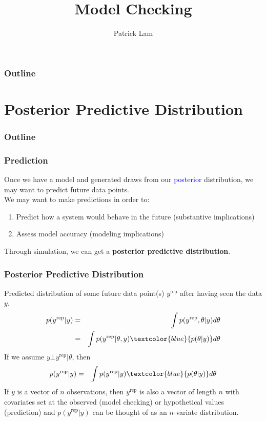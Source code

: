 \documentclass{beamer}
\author{Patrick Lam}
\title{Model Checking}
\date{}
\begin{document}
\newcommand{\red}{\textcolor{red}}
\newcommand{\blue}{\textcolor{blue}}
\newcommand{\cyan}{\textcolor{cyan}}
\newcommand{\purple}{\textcolor{purple}}
\newcommand{\brown}{\textcolor{brown}}

\frame{\titlepage}

\begin{frame}
\frametitle{Outline}
\tableofcontents
\end{frame}

\section{Posterior Predictive Distribution}

\begin{frame}
\frametitle{Outline}
\tableofcontents[currentsection]
\end{frame}

\begin{frame}
\frametitle{Prediction}
\pause
Once we have a model and generated draws from our \blue{posterior}
distribution, we may want to predict future data points.  \\
\pause
\bigskip
We may want to make predictions in order to:
\pause
\begin{enumerate}
\item Predict how a system would behave in the future (substantive implications)
\pause
\item Assess model accuracy (modeling implications)
\end{enumerate}
\pause
\bigskip
Through simulation, we can get a \textbf{posterior predictive distribution}.
\end{frame}

\begin{frame}
\frametitle{Posterior Predictive Distribution}
\pause
Predicted distribution of some future data point(s) $y^{\mathrm{rep}}$ after
having seen the data $y$.
\pause
\begin{eqnarray*}
p(y^{\mathrm{rep}} | y) &=& \int p(y^{\mathrm{rep}}, \theta | y) d\theta \\
&=& \int p(y^{\mathrm{rep}} | \theta, y) \textcolor{blue}{p(\theta | y)} d\theta
\end{eqnarray*}
\pause
If we assume $y \bot y^{\mathrm{rep}} | \theta$, then
\pause
\begin{eqnarray*}
p(y^{\mathrm{rep}} | y) &=&  \int p(y^{\mathrm{rep}} | y) \textcolor{blue}{p(\theta | y)} d\theta
\end{eqnarray*}
\pause
If $y$ is a vector of $n$ observations, then $y^{\mathrm{rep}}$ is
also a vector of length $n$ with covariates set at the observed (model
checking) or hypothetical values (prediction) \pause and
$p(y^{\mathrm{rep}} | y)$ can be thought of as an $n$-variate distribution.
\end{frame}
\end{document}
